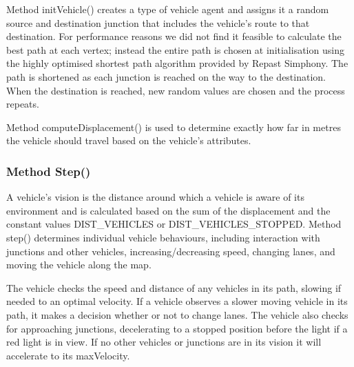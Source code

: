 \documentclass[11pt]{article}
\begin{document}
Method initVehicle() creates a type of vehicle agent and assigns it a random source and destination junction that includes the vehicle\textquoteright s route to that destination. For performance reasons we did not find it feasible to calculate the best path at each vertex; instead the entire path is chosen at initialisation using the highly optimised shortest path algorithm provided by Repast Simphony. The path is shortened as each junction is reached on the way to the destination. When the destination is reached, new random values are chosen and the process repeats.

Method computeDisplacement() is used to determine exactly how far in metres the vehicle should travel based on the vehicle\textquoteright s attributes. 


\subsubsection{Method Step()}


A vehicle\textquoteright s vision is the distance around which a vehicle is aware of its environment and is calculated based on the sum of the displacement and the constant values DIST{\_}VEHICLES or DIST{\_}VEHICLES{\_}STOPPED. Method step() determines individual vehicle behaviours, including interaction with junctions and other vehicles, increasing/decreasing speed, changing lanes, and moving the vehicle along the map.

The vehicle checks the speed and distance of any vehicles in its path, slowing if needed to an optimal velocity. If a vehicle observes a slower moving vehicle in its path, it makes a decision whether or not to change lanes. The vehicle also checks for approaching junctions, decelerating to a stopped position before the light if a red light is in view. If no other vehicles or junctions are in its vision it will accelerate to its maxVelocity. 
\\
\end{document}
